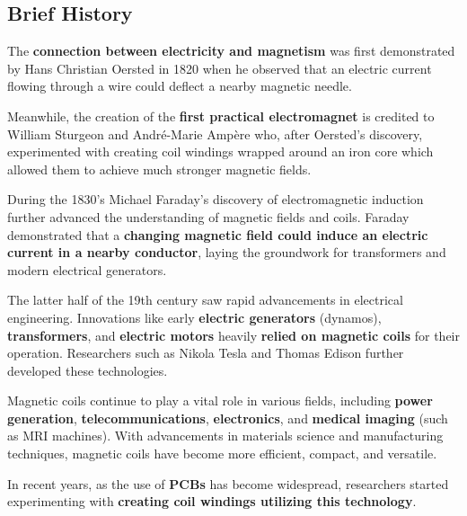 \subsection{Brief History}

The \textbf{connection between electricity and magnetism} was first demonstrated by Hans Christian Oersted in 1820 when he observed that an electric current flowing through a wire could deflect a nearby magnetic needle.

Meanwhile, the creation of the \textbf{first practical electromagnet} is credited to William Sturgeon and André-Marie Ampère who, after Oersted's discovery, experimented with creating coil windings wrapped around an iron core which allowed them to achieve much stronger magnetic fields.

During the 1830's Michael Faraday's discovery of electromagnetic induction further advanced the understanding of magnetic fields and coils. Faraday demonstrated that a \textbf{changing magnetic field could induce an electric current in a nearby conductor}, laying the groundwork for transformers and modern electrical generators.

The latter half of the 19th century saw rapid advancements in electrical engineering. Innovations like early \textbf{electric generators} (dynamos), \textbf{transformers}, and \textbf{electric motors} heavily \textbf{relied on magnetic coils} for their operation. Researchers such as Nikola Tesla and Thomas Edison further developed these technologies.

Magnetic coils continue to play a vital role in various fields, including \textbf{power generation}, \textbf{telecommunications}, \textbf{electronics}, and \textbf{medical imaging} (such as MRI machines). With advancements in materials science and manufacturing techniques, magnetic coils have become more efficient, compact, and versatile.

In recent years, as the use of \textbf{PCBs} has become widespread, researchers started experimenting with \textbf{creating coil windings utilizing this technology}.